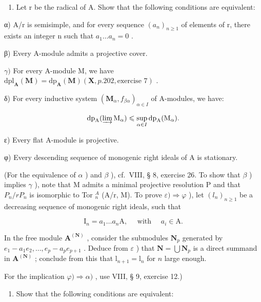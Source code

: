 \begin{enumerate}
\def\labelenumi{\arabic{enumi})}
\setcounter{enumi}{20}
\tightlist
\item
  Let r be the radical of A. Show that the following conditions are equivalent:
\end{enumerate}

α) A/r is semisimple, and for every sequence \((a_{n})_{n\geq1}\) of elements of r, there exists an integer n such that \(a_{1}\ldots a_{n}=0\) .

β) Every A-module admits a projective cover.

\(\gamma)\) For every A-module M, we have \(\mathrm{dpl}_{\mathbf{A}}(\mathbf{M}) = \mathrm{dp}_{\mathbf{A}}(\mathbf{M})(\mathbf{X}, p. 202, \text{exercise } 7)\) .

δ) For every inductive system \((\mathbf{M}_{\alpha}, f_{\beta\alpha})_{\alpha \in I}\) of A-modules, we have:

\[
\mathrm{dp} _ {\mathrm{A}} (\varinjlim \mathrm{M} _ {\alpha}) \leqslant \sup _ {\alpha \in I} \mathrm{dp} _ {\mathrm{A}} (\mathrm{M} _ {\alpha}).
\]

ε) Every flat A-module is projective.

φ) Every descending sequence of monogenic right ideals of A is stationary.

(For the equivalence of \(\alpha\) ) and \(\beta\) ), cf.~VIII, § 8, exercise 26. To show that \(\beta\) ) implies \(\gamma\) ), note that M admits a minimal projective resolution P and that \(P_n/rP_n\) is isomorphic to Tor \(_n^A\) (A/r, M). To prove \(\varepsilon) \Rightarrow \varphi\) ), let \((l_n)_{n \geq 1}\) be a decreasing sequence of monogenic right ideals, such that

\[
\mathrm{I} _ {n} = a _ {1} \dots a _ {n} \mathrm{A}, \quad \text { with } \quad a _ {i} \in \mathrm{A}.
\]

In the free module \(\mathbf{A}^{(\mathbf{N})}\) , consider the submodules \(\mathbf{N}_p\) generated by \(e_1 - a_1 e_2, \ldots, e_p - a_p e_{p+1}\) . Deduce from \(\varepsilon\) ) that \(\mathbf{N} = \bigcup \mathbf{N}_p\) is a direct summand in \(\mathbf{A}^{(\mathbf{N})}\) ; conclude from this that \(\mathrm{l}_{n+1} = \mathrm{l}_n\) for \(n\) large enough.

For the implication \(\varphi) \Rightarrow \alpha)\) , use VIII, § 9, exercise 12.)

\begin{enumerate}
\def\labelenumi{\arabic{enumi})}
\setcounter{enumi}{21}
\tightlist
\item
  Show that the following conditions are equivalent:
\end{enumerate}

